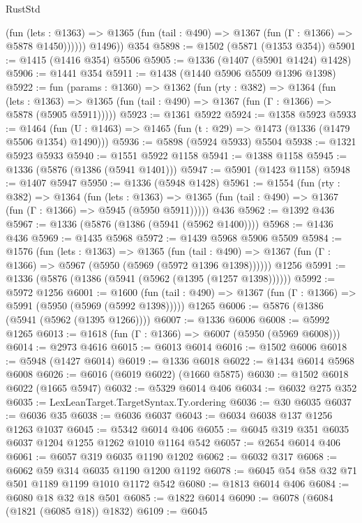 \begin{lexlean}{RustStd}
\begin{coremodule}
              (fun (lets : @1363) =>
              @1365 (fun (tail : @490) => @1367 (fun (Γ : @1366) => @5878 @1450))))))
        @1496))
    @354
@5898 := @1502 (@5871 (@1353 @354))
@5901 := @1415 (@1416 @354) @5506
@5905 := @1336 (@1407 (@5901 @1424) @1428)
@5906 := @1441 @354
@5911 := @1438 (@1440 @5906 @5509 @1396 @1398)
@5922 := fun (params : @1360) =>
  @1362
    (fun (rty : @382) =>
    @1364
      (fun (lets : @1363) =>
      @1365 (fun (tail : @490) => @1367 (fun (Γ : @1366) => @5878 (@5905 @5911)))))
@5923 := @1361 @5922
@5924 := @1358 @5923
@5933 := @1464 (fun (U : @1463) => @1465 (fun (t : @29) => @1473 (@1336 (@1479 @5506 @1354) @1490)))
@5936 := @5898 (@5924 @5933) @5504
@5938 := @1321 @5923 @5933
@5940 := @1551 @5922 @1158
@5941 := @1388 @1158
@5945 := @1336 (@5876 (@1386 (@5941 @1401)))
@5947 := @5901 (@1423 @1158)
@5948 := @1407 @5947
@5950 := @1336 (@5948 @1428)
@5961 := @1554
    (fun (rty : @382) =>
    @1364
      (fun (lets : @1363) =>
      @1365 (fun (tail : @490) => @1367 (fun (Γ : @1366) => @5945 (@5950 @5911)))))
    @436
@5962 := @1392 @436
@5967 := @1336 (@5876 (@1386 (@5941 (@5962 @1400))))
@5968 := @1436 @436
@5969 := @1435 @5968
@5972 := @1439 @5968 @5906 @5509
@5984 := @1576
    (fun (lets : @1363) =>
    @1365
      (fun (tail : @490) => @1367 (fun (Γ : @1366) => @5967 (@5950 (@5969 (@5972 @1396 @1398))))))
    @1256
@5991 := @1336 (@5876 (@1386 (@5941 (@5962 (@1395 (@1257 @1398))))))
@5992 := @5972 @1256
@6001 := @1600
    (fun (tail : @490) => @1367 (fun (Γ : @1366) => @5991 (@5950 (@5969 (@5992 @1398)))))
    @1265
@6006 := @5876 (@1386 (@5941 (@5962 (@1395 @1266))))
@6007 := @1336 @6006
@6008 := @5992 @1265
@6013 := @1618 (fun (Γ : @1366) => @6007 (@5950 (@5969 @6008)))
@6014 := @2973 @4616
@6015 := @6013 @6014
@6016 := @1502 @6006
@6018 := @5948 (@1427 @6014)
@6019 := @1336 @6018
@6022 := @1434 @6014 @5968 @6008
@6026 := @6016 (@6019 @6022) (@1660 @5875)
@6030 := @1502 @6018 @6022 (@1665 @5947)
@6032 := @5329 @6014 @406
@6034 := @6032 @275 @352
@6035 := LexLeanTarget.TargetSyntax.Ty.ordering
@6036 := @30 @6035
@6037 := @6036 @35
@6038 := @6036 @6037
@6043 := @6034 @6038 @137 @1256 @1263 @1037
@6045 := @5342 @6014 @406
@6055 := @6045 @319 @351 @6035 @6037 @1204 @1255 @1262 @1010 @1164 @542
@6057 := @2654 @6014 @406
@6061 := @6057 @319 @6035 @1190 @1202
@6062 := @6032 @317
@6068 := @6062 @59 @314 @6035 @1190 @1200 @1192
@6078 := @6045 @54 @58 @32 @71 @501 @1189 @1199 @1010 @1172 @542
@6080 := @1813 @6014 @406
@6084 := @6080 @18 @32 @18 @501
@6085 := @1822 @6014
@6090 := @6078 (@6084 (@1821 (@6085 @18)) @1832)
@6109 := @6045

\end{coremodule}
\end{lexlean}

